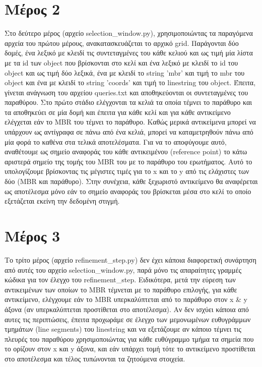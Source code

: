 \documentclass{article}[40pt]
\begin{document}
\section{Μέρος 2}
Στο δεύτερο μέρος (αρχείο selection\_window.py), χρησιμοποιώντας τα παραγόμενα αρχεία του πρώτου μέρους, ανακατασκευάζεται το αρχικό grid. Παράγονται δύο δομές, ένα λεξικό με κλειδί τις συντεταγμένες του κάθε κελιού και ως τιμή μία λίστα με τα id των object που βρίσκονται στο κελί και ένα λεξικό με κλειδί το id του object και ως τιμή δύο λεξικά, ένα με κλειδί το string 'mbr' και τιμή το mbr του object και ένα με κλειδί το string 'coords' και τιμή το linestring του object. Έπειτα, γίνεται ανάγνωση του αρχείου queries.txt και αποθηκεύονται οι συντεταγμένες του παραθύρου. Στο πρώτο στάδιο ελέγχονται τα κελιά τα οποία τέμνει το παράθυρο και τα αποθηκεύει σε μία δομή και έπειτα για κάθε κελί και για κάθε αντικείμενο ελέγχεται εάν το MBR του τέμνει το παράθυρο. Καθώς μερικά αντικείμενα μπορεί να υπάρχουν ως αντίγραφα σε πάνω από ένα κελιά, μπορεί να καταμετρηθούν πάνω από μία φορά το καθένα στα τελικά αποτελέσματα. Για να το αποφύγουμε αυτό, αναθέτουμε ως σημείο αναφοράς του κάθε αντικειμένου (reference point) το κάτω αριστερά σημείο της τομής του MBR του με το παράθυρο του ερωτήματος. Αυτό το υπολογίζουμε βρίσκοντας τις μέγιστες τιμές για το x και το y από τις ελάχιστες των δύο (MBR και παράθυρο). Στην συνέχεια, κάθε ξεχωριστό αντικείμενο θα αναφέρεται ως αποτέλεσμα μόνο εάν το σημείο αναφοράς του βρίσκεται μέσα στο κελί το οποίο εξετάζεται εκείνη την δεδομένη στιγμή.
\section{Μέρος 3}
Το τρίτο μέρος (αρχείο refinement\_step.py) δεν έχει κάποια διαφορετική συνάρτηση από αυτές του αρχείο selection\_window.py, παρά μόνο τις απαραίτητες γραμμές κώδικα για τον έλεγχο του refinement\_step. Ειδικότερα, μετά την εύρεση των αντικειμένων των οποίων το MBR τέμνεται με το παράθυρο επιλογής, για κάθε αντικείμενο, ελέγχουμε εάν το MBR υπερκαλύπτεται από το παράθυρο στον x \& y άξονα (αν υπερκαλύπτεται προστίθεται στο αποτέλεσμα). Αν δεν ισχύει κάποια από αυτες τις περιπτώσεις, έπειτα  προχωράμε σε έλεγχο των μεμονωμένων ευθυγράμμων τμημάτων (line segments) του linestring και να εξετάζουμε αν κάποιο τέμνει τις πλευρές του παραθύρου χρησιμοποιώντας για κάθε ευθύγραμμο τμήμα τα σημεία που το ορίζουν στον x και y άξονα, και εάν υπάρχει τομή τότε το αντικείμενο προστίθεται στο αποτέλεσμα και τέλος τυπώνονται τα ζητούμενα στοιχεία.
\newpage
\end{document}

